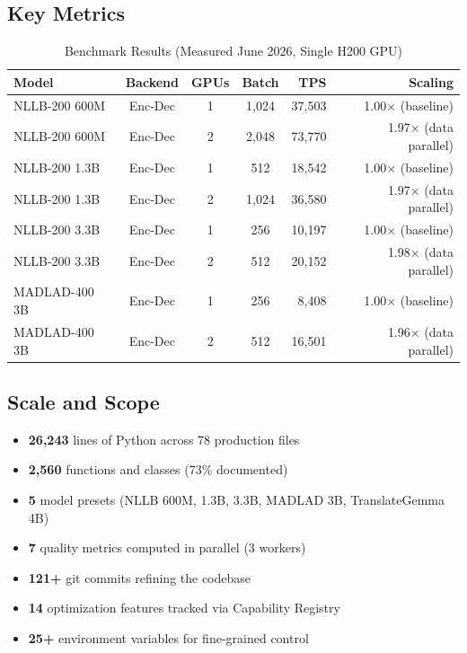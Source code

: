 \documentclass[11pt,a4paper,twoside]{article}
\begin{document}
\subsection{Key Metrics}

\begin{table}[H]
\centering
\caption{Benchmark Results (Measured June 2026, Single H200 GPU)}
\label{tab:results}
\begin{tabular}{lcccrr}
\toprule
\textbf{Model} & \textbf{Backend} & \textbf{GPUs} & \textbf{Batch} & \textbf{TPS} & \textbf{Scaling} \\
\midrule
NLLB-200 600M  & Enc-Dec & 1 & 1,024  & 37,503 & 1.00× (baseline) \\
NLLB-200 600M  & Enc-Dec & 2 & 2,048  & 73,770 & 1.97× (data parallel) \\
NLLB-200 1.3B  & Enc-Dec & 1 & 512    & 18,542 & 1.00× (baseline) \\
NLLB-200 1.3B  & Enc-Dec & 2 & 1,024  & 36,580 & 1.97× (data parallel) \\
NLLB-200 3.3B  & Enc-Dec & 1 & 256    & 10,197 & 1.00× (baseline) \\
NLLB-200 3.3B  & Enc-Dec & 2 & 512    & 20,152 & 1.98× (data parallel) \\
MADLAD-400 3B  & Enc-Dec & 1 & 256    & 8,408  & 1.00× (baseline) \\
MADLAD-400 3B  & Enc-Dec & 2 & 512    & 16,501 & 1.96× (data parallel) \\
\bottomrule
\end{tabular}
\end{table}

\subsection{Scale and Scope}

\begin{itemize}[nosep]
  \item \textbf{26,243} lines of Python across 78 production files
  \item \textbf{2,560} functions and classes (73\% documented)
  \item \textbf{5} model presets (NLLB 600M, 1.3B, 3.3B, MADLAD 3B, TranslateGemma 4B)
  \item \textbf{7} quality metrics computed in parallel (3 workers)
  \item \textbf{121+} git commits refining the codebase
  \item \textbf{14} optimization features tracked via Capability Registry
  \item \textbf{25+} environment variables for fine-grained control
\end{itemize}
\end{document}
